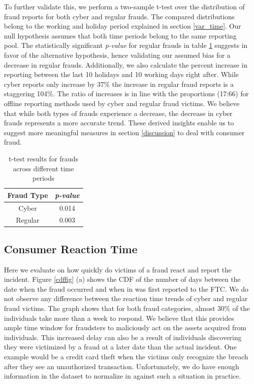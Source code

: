 \documentclass[conference]{IEEEtran}
\begin{document}
To further validate this, we perform a two-sample t-test over the distribution of fraud reports for both cyber and regular frauds. The compared distributions belong to the working and holiday period explained in section \ref{var_time}. Our null hypothesis assumes that both time periods belong to the same reporting pool. The statistically significant \emph{p-value} for regular frauds in table \ref{ttest} suggests in favor of the alternative hypothesis, hence validating our assumed bias for a decrease in regular frauds. Additionally, we also calculate the percent increase in reporting between the last 10 holidays and 10 working days right after. While cyber reports only increase by 37\% the increase in regular fraud reports is a staggering 104\%. The ratio of increases is in line with the proportions (17:66) for offline reporting methods used by cyber and regular fraud victims. We believe that while both types of frauds experience a decrease, the decrease in cyber frauds represents a more accurate trend. These derived insights enable us to suggest more meaningful measures in section \ref{discussion} to deal with consumer fraud.




\vspace{-8pt}

\begin{table}[h]
\centering
\begin{tabular}{cc}
\hline
\multicolumn{1}{c}{\bfseries Fraud Type} & \multicolumn{1}{c}{\bfseries \emph{p-value}}
\\
\hline
\hline
Cyber & 0.014\\
\hline
Regular & 0.003\\
\hline
\end{tabular}
\vspace{8pt}
\caption{t-test results for frauds across different time periods}\label{ttest}
\vspace{-10pt}
\end{table}



\subsection{Consumer Reaction Time}\label{reaction_time}

Here we evaluate on how quickly do victims of a fraud react and report the incident. Figure \ref{cdffig} (a) shows the CDF of the number of days between the date when the fraud occurred and when in was first reported to the FTC. We do not observe any difference between the reaction time trends of cyber and regular fraud victims. The graph shows that for both fraud categories, almost 30\% of the individuals take more than a week to respond. We believe that this provides ample time window for fraudsters to maliciously act on the assets acquired from individuals. This increased delay can also be a result of individuals discovering they were victimized by a fraud at a later date than the actual incident. One example would be a credit card theft when the victims only recognize the breach after they see an unauthorized transaction. Unfortunately, we do have enough information in the dataset to normalize in against such a situation in practice.
\end{document}
